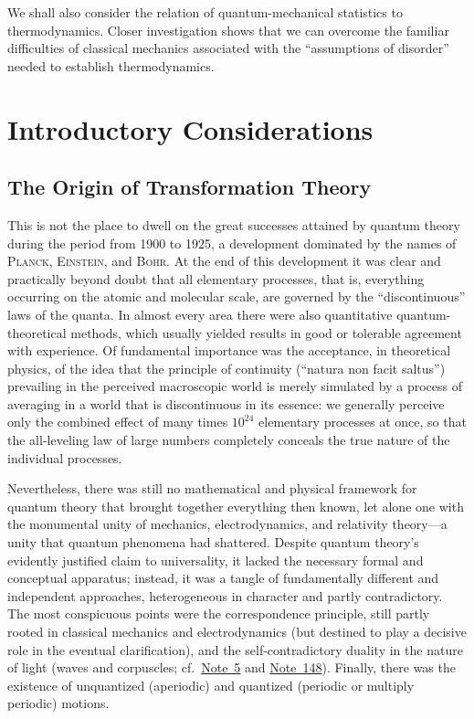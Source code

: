 \documentclass[fontsize=13pt,twoside,openany,headings=normal,parskip=false,bookmarkpackage=false,DIV=calc]{scrbook}
\begin{document}
We shall also consider the relation of quantum-mechanical statistics to thermodynamics. Closer investigation shows that we can overcome the familiar difficulties of classical mechanics associated with the ``assumptions of disorder'' needed to establish thermodynamics.

\chapter{Introductory Considerations}\label{chap:I}
\hypertarget{origpage-4}{}%
\section{The Origin of Transformation Theory}\label{sec:I.1}
This is not the place to dwell on the great successes attained by quantum theory during the period from 1900 to 1925, a development dominated by the names of \textsc{Planck}, \textsc{Einstein}, and \textsc{Bohr}. At the end of this development it was clear and practically beyond doubt that all elementary processes, that is, everything occurring on the atomic and molecular scale, are governed by the ``discontinuous'' laws of the quanta. In almost every area there were also quantitative quantum-theoretical methods, which usually yielded results in good or tolerable agreement with experience. Of fundamental importance was the acceptance, in theoretical physics, of the idea that the principle of continuity (``natura non facit saltus'') prevailing in the perceived macroscopic world is merely simulated by a process of averaging in a world that is discontinuous in its essence: we generally perceive only the combined effect of many times $10^{24}$ elementary processes at once, so that the all-leveling law of large numbers completely conceals the true nature of the individual processes.

Nevertheless, there was still no mathematical and physical framework for quantum theory that brought together everything then known, let alone one with the monumental unity of mechanics, electrodynamics, and relativity theory---a unity that quantum phenomena had shattered. Despite quantum theory's evidently justified claim to universality, it lacked the necessary formal and conceptual apparatus; instead, it was a tangle of fundamentally different and independent approaches, heterogeneous in character and partly contradictory. The most conspicuous points were the correspondence principle, still partly rooted in classical mechanics and electrodynamics (but destined to play a decisive role in the eventual clarification), and the self-contradictory duality in the nature of light (waves and corpuscles; cf.\ \hyperlink{note-5}{Note~5} and \hyperlink{note-148}{Note~148}). Finally, there was the existence of unquantized (aperiodic) and quantized (periodic or multiply periodic) motions.
\end{document}
